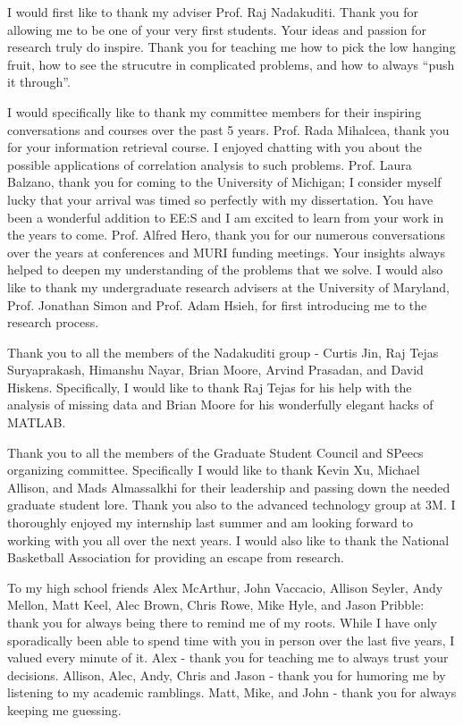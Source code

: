 I would first like to thank my adviser Prof. Raj Nadakuditi. Thank you for allowing me to
be one of your very first students. Your ideas and passion for research truly do
inspire. Thank you for teaching me how to pick the low hanging fruit, how to see the
strucutre in complicated problems, and how to always ``push it through''.

I would specifically like to thank my committee members for their inspiring conversations
and courses over the past 5 years. Prof. Rada Mihalcea, thank you for your information
retrieval course. I enjoyed chatting with you about the possible applications of
correlation analysis to such problems. Prof. Laura Balzano, thank you for coming to the
University of Michigan; I consider myself lucky that your arrival was timed so perfectly
with my dissertation. You have been a wonderful addition to EE:S and I am excited to learn
from your work in the years to come. Prof. Alfred Hero, thank you for our numerous
conversations over the years at conferences and MURI funding meetings. Your insights
always helped to deepen my understanding of the problems that we solve. I would also like
to thank my undergraduate research advisers at the University of Maryland, Prof. Jonathan
Simon and Prof. Adam Hsieh, for first introducing me to the research process.

Thank you to all the members of the Nadakuditi group - Curtis Jin, Raj Tejas Suryaprakash,
Himanshu Nayar, Brian Moore, Arvind Prasadan, and David Hiskens. Specifically, I would
like to thank Raj Tejas for his help with the analysis of missing data and Brian Moore for
his wonderfully elegant hacks of \textsc{MATLAB}.

Thank you to all the members of the Graduate Student Council and SPeecs organizing
committee. Specifically I would like to thank Kevin Xu, Michael Allison, and Mads
Almassalkhi for their leadership and passing down the needed graduate student lore. Thank
you also to the advanced technology group at 3M. I thoroughly enjoyed my internship last
summer and am looking forward to working with you all over the next years. I would also
like to thank the National Basketball Association for providing an escape from research. 

To my high school friends Alex McArthur, John Vaccacio, Allison Seyler, Andy Mellon, Matt
Keel, Alec Brown, Chris Rowe, Mike Hyle, and Jason Pribble: thank you for always being
there to remind me of my roots. While I have only sporadically been able to spend time
with you in person over the last five years, I valued every minute of it. Alex - thank you
for teaching me to always trust your decisions. Allison, Alec, Andy, Chris and Jason -
thank you for humoring me by listening to my academic ramblings. Matt, Mike, and John
- thank you for always keeping me guessing. 

